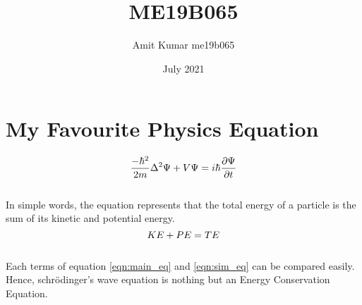 \documentclass{article}
\title{ME19B065}
\author{Amit Kumar me19b065}
\date{July 2021}
\begin{document}
\maketitle

\section{My Favourite Physics Equation}
\hspace{6mm}
\begin{equation}
\label{eqn:main_eq}
\Large
      \frac{-\hbar^2}{2m}\Delta^2{\Psi} + V\Psi = i\hbar{\frac{\partial \Psi}{\partial t}}
\end{equation}
\\
In simple words, the equation represents that the total energy of a particle is the sum of its kinetic and potential energy. \\
\begin{equation}
\label{eqn:sim_eq}
\Large
    KE+PE=TE
\end{equation}
\\
Each terms of equation \ref{eqn:main_eq} and \ref{eqn:sim_eq} can be compared easily. Hence, schrödinger's wave equation is nothing but an Energy Conservation Equation.
\end{document}
